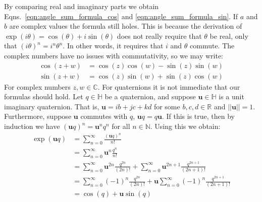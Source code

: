 \documentclass{article}
\begin{document}
            By comparing real and imaginary parts we obtain
            Eqns.~\ref{eqn:angle_sum_formula_cos} and
            \ref{eqn:angle_sum_formula_sin}. If $a$ and $b$ are complex
            values the formula still holes. This is because the derivation
            of $\exp(i\theta)=\cos(\theta)+i\sin(\theta)$ does not really
            require that $\theta$ be real, only that
            $(i\theta)^{n}=i^{n}\theta^{n}$. In other words, it requires that
            $i$ and $\theta$ commute. The complex numbers have no issues with
            commutativity, so we may write:
            \begin{align}
                \label{eqn:angle_sum_formula_complex_cos}
                \cos(z+w)&=\cos(z)\cos(w)-\sin(z)\sin(w)\\
                \label{eqn:angle_sum_formula_complex_sin}
                \sin(z+w)&=\cos(z)\sin(w)+\sin(z)\cos(w)
            \end{align}
            For complex numbers $z,w\in\mathbb{C}$. For quaternions it is not
            immediate that our formulas should hold. Let $q\in\mathbb{H}$ be
            a quaternion, and suppose $\mathbf{u}\in\mathbb{H}$ is a unit
            imaginary quaternion. That is,
            $\mathbf{u}=ib+jc+kd$ for some $b,c,d\in\mathbb{R}$ and
            $||\mathbf{u}||=1$. Furthermore, suppose $\mathbf{u}$ commutes with
            $q$, $\mathbf{u}q=q\mathbf{u}$. If this is true, then by induction
            we have $(\mathbf{u}q)^{n}=\mathbf{u}^{n}q^{n}$ for all
            $n\in\mathbb{N}$. Using this we obtain:
            \begin{subequations}
                \begin{align}
                    \exp(\mathbf{u}q)
                    &=\sum_{n=0}^{\infty}\frac{(\mathbf{u}q)^{n}}{n!}\\
                    &=\sum_{n=0}^{\infty}\mathbf{u}^{n}\frac{q^{n}}{n!}\\
                    &=\sum_{n=0}^{\infty}\mathbf{u}^{2n}\frac{q^{2n}}{(2n)!}
                        +\sum_{n=0}^{\infty}
                        \mathbf{u}^{2n+1}\frac{q^{2n+1}}{(2n+1)!}\\
                    &=\sum_{n=0}^{\infty}(-1)^{n}\frac{q^{2n}}{(2n)!}
                        +\mathbf{u}
                        \sum_{n=0}^{\infty}(-1)^{n}\frac{q^{2n+1}}{(2n+1)!}\\
                    &=\cos(q)+\mathbf{u}\sin(q)
                \end{align}
            \end{subequations}
\end{document}
